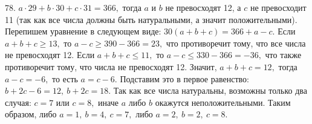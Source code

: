 78. $a\cdot29+b\cdot30+c\cdot31=366,$ тогда $a$ и $b$ не превосходят 12, а $c$ не превосходит 11 (так как все числа должны быть натуральными, а значит положительными). Перепишем уравнение в следующем виде: $30(a+b+c)=366+a-c.$ Если $a+b+c\geqslant 13,$ то $a-c\geqslant390-366=23,$ что противоречит тому, что все числа не превосходят 12. Если $a+b+c\leqslant 11,$ то $a-c\leqslant 330-366=-36,$ что также противоречит тому, что числа не превосходят 12. Значит, $a+b+c=12,$ тогда $a-c=-6,$ то есть $a=c-6.$ Подставим это в первое равенство: $b+2c-6=12,\ b+2c=18.$ Так как все числа натуральны, возможны только два случая: $c=7$ или $c=8,$ иначе $a$ либо $b$ окажутся неположительными. Таким образом, либо $a=1,\ b=4,\ c=7,$ либо $a=2,\ b=2,\ c=8.$\\
